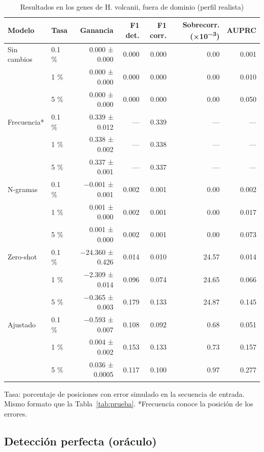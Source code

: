 \documentclass[sigconf,nonacm]{acmart}
\begin{document}
\begin{table}[t]
\caption{Resultados en los genes de H. volcanii, fuera de dominio (perfil realista)}
\label{tab:arqueas}
\small
\begin{tabular}{llrrrrr}
\toprule
\textbf{Modelo} & \textbf{Tasa} & \textbf{Ganancia} & \textbf{F1 det.} & \textbf{F1 corr.} & \textbf{Sobrecorr. (×10\textsuperscript{−3})} & \textbf{AUPRC} \\
\midrule
Sin cambios & 0.1 \% & 0.000 ± 0.000 & 0.000 & 0.000 & 0.00 & 0.001 \\
 & 1 \% & 0.000 ± 0.000 & 0.000 & 0.000 & 0.00 & 0.010 \\
 & 5 \% & 0.000 ± 0.000 & 0.000 & 0.000 & 0.00 & 0.050 \\
\midrule
Frecuencia* & 0.1 \% & 0.339 ± 0.012 & --- & 0.339 & --- & --- \\
 & 1 \% & 0.338 ± 0.002 & --- & 0.338 & --- & --- \\
 & 5 \% & 0.337 ± 0.001 & --- & 0.337 & --- & --- \\
\midrule
N-gramas & 0.1 \% & −0.001 ± 0.001 & 0.002 & 0.001 & 0.00 & 0.002 \\
 & 1 \% & 0.001 ± 0.000 & 0.002 & 0.001 & 0.00 & 0.017 \\
 & 5 \% & 0.001 ± 0.000 & 0.002 & 0.001 & 0.00 & 0.073 \\
\midrule
Zero-shot & 0.1 \% & −24.360 ± 0.426 & 0.014 & 0.010 & 24.57 & 0.014 \\
 & 1 \% & −2.309 ± 0.014 & 0.096 & 0.074 & 24.65 & 0.066 \\
 & 5 \% & −0.365 ± 0.003 & 0.179 & 0.133 & 24.87 & 0.145 \\
\midrule
Ajustado & 0.1 \% & −0.593 ± 0.007 & 0.108 & 0.092 & 0.68 & 0.051 \\
 & 1 \% & 0.004 ± 0.002 & 0.153 & 0.133 & 0.73 & 0.157 \\
 & 5 \% & 0.036 ± 0.0005 & 0.117 & 0.100 & 0.97 & 0.277 \\
\bottomrule
\end{tabular}

\vspace{2pt}\begin{minipage}{\textwidth}\footnotesize Tasa: porcentaje de posiciones con error simulado en la secuencia de entrada. Mismo formato que la Tabla~\ref{tab:prueba}. *Frecuencia conoce la posición de los errores.\end{minipage}
\end{table}

\subsection{Detección perfecta (oráculo)}\label{sec:res-oraculo}
\end{document}
